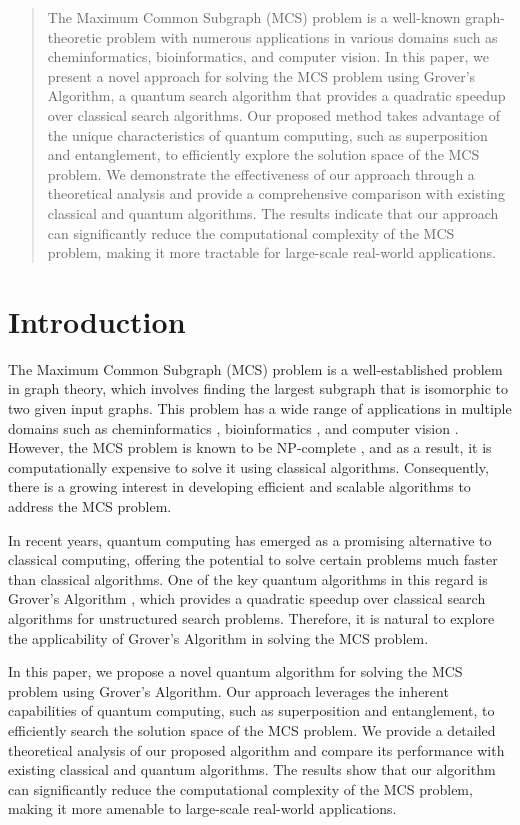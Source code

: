 \begin{abstract}
The Maximum Common Subgraph (MCS) problem is a well-known graph-theoretic problem with numerous applications in various domains such as cheminformatics, bioinformatics, and computer vision. In this paper, we present a novel approach for solving the MCS problem using Grover's Algorithm, a quantum search algorithm that provides a quadratic speedup over classical search algorithms. Our proposed method takes advantage of the unique characteristics of quantum computing, such as superposition and entanglement, to efficiently explore the solution space of the MCS problem. We demonstrate the effectiveness of our approach through a theoretical analysis and provide a comprehensive comparison with existing classical and quantum algorithms. The results indicate that our approach can significantly reduce the computational complexity of the MCS problem, making it more tractable for large-scale real-world applications.
\end{abstract}

\section{Introduction}

The Maximum Common Subgraph (MCS) problem is a well-established problem in graph theory, which involves finding the largest subgraph that is isomorphic to two given input graphs. This problem has a wide range of applications in multiple domains such as cheminformatics \cite{raymond2002maximum}, bioinformatics \cite{pinter2005alignment}, and computer vision \cite{conte2004thirty}. However, the MCS problem is known to be NP-complete \cite{garey1979computers}, and as a result, it is computationally expensive to solve it using classical algorithms. Consequently, there is a growing interest in developing efficient and scalable algorithms to address the MCS problem.

In recent years, quantum computing has emerged as a promising alternative to classical computing, offering the potential to solve certain problems much faster than classical algorithms. One of the key quantum algorithms in this regard is Grover's Algorithm \cite{grover1996fast}, which provides a quadratic speedup over classical search algorithms for unstructured search problems. Therefore, it is natural to explore the applicability of Grover's Algorithm in solving the MCS problem.

In this paper, we propose a novel quantum algorithm for solving the MCS problem using Grover's Algorithm. Our approach leverages the inherent capabilities of quantum computing, such as superposition and entanglement, to efficiently search the solution space of the MCS problem. We provide a detailed theoretical analysis of our proposed algorithm and compare its performance with existing classical and quantum algorithms. The results show that our algorithm can significantly reduce the computational complexity of the MCS problem, making it more amenable to large-scale real-world applications.

